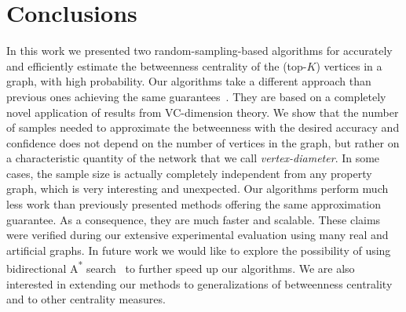\section{Conclusions}\label{sec:concl}
In this work we presented two random-sampling-based algorithms for accurately and
efficiently estimate the betweenness centrality of the (top-$K$) vertices in a
graph, with high probability.
Our algorithms take a different approach than previous ones achieving the same
guarantees~\citep{BrandesP07,GeisbergerSS08,JacobKLPT05}. They are based on a
completely novel application of results from VC-dimension theory. We show that
the number of samples needed to approximate the betweenness with the desired
accuracy and confidence does not depend on the number of vertices in the graph,
but rather on a characteristic quantity of the network that we call
\emph{vertex-diameter}. In some cases, the sample size is actually completely
independent from any property graph, which is very interesting and unexpected.
Our algorithms perform much less work than previously presented methods offering
the same approximation guarantee. As a consequence, they are much faster and
scalable. These claims were verified during our extensive experimental
evaluation using many real and artificial graphs. In future work we would like
to explore the possibility of using bidirectional A\textsuperscript{*}
search~\citep{Pohl69,KaindlK97} to further speed up our algorithms.  We are also
interested in extending our methods to generalizations of betweenness
centrality~\citep{KourtellisASIT12,DolevEP10} and to other centrality measures. 

